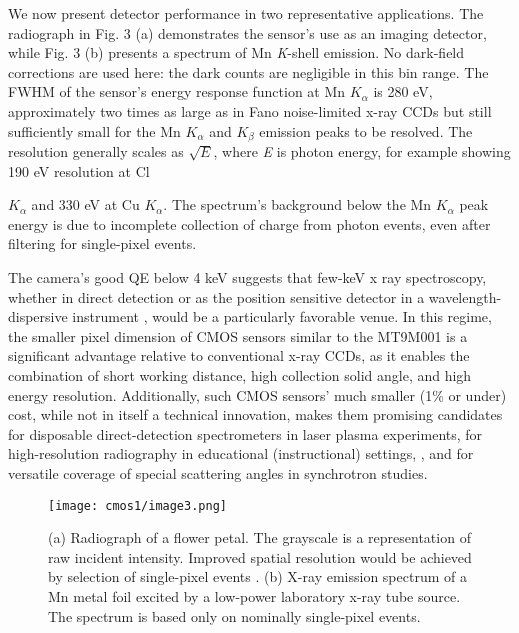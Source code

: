 We now present detector performance in two representative applications.
The radiograph in Fig. 3 (a) demonstrates the sensor's use as an imaging
detector, while Fig. 3 (b) presents a spectrum of Mn \emph{K}-shell
emission. No dark-field corrections are used here: the dark counts are
negligible in this bin range. The FWHM of the sensor's energy response
function at Mn \(K_{\alpha}\) is 280 eV, approximately two times as
large as in Fano noise-limited x-ray CCDs but still sufficiently small
for the Mn \(K_{\alpha}\) and \(K_{\beta}\) emission peaks to be
resolved. The resolution generally scales as \(\sqrt{E}\), where
\emph{E} is photon energy, for example showing 190 eV resolution at Cl
\(K_{\alpha}\)
and 330 eV at Cu \(K_{\alpha}\). The spectrum's background below the Mn
\(K_{\alpha}\) peak energy is due to incomplete collection of charge
from photon events, even after filtering for single-pixel events.

The camera's good QE below 4 keV suggests that few-keV x ray
spectroscopy, whether in direct detection or as the position sensitive
detector in a wavelength-dispersive
instrument \cite{HUOTARI2005IMPROVING}, would be a
particularly favorable venue. In this regime, the smaller pixel
dimension of CMOS sensors similar to the MT9M001 is a significant
advantage relative to conventional x-ray CCDs, as it enables the
combination of short working distance, high collection solid angle, and
high energy
resolution.
 \cite{PACOLD2012MINIATURE, MATTERN2012PLASTIC, DICKINSON2008SHORT} Additionally, such
CMOS sensors' much smaller (1\% or under) cost, while not in itself a
technical innovation, makes them promising candidates for disposable
direct-detection spectrometers in laser plasma experiments, for
high-resolution radiography in educational (instructional) settings, ,
and for versatile coverage of special scattering angles in synchrotron
studies.

\begin{figure}[h] \label{cm1image3}
\caption{ (a) Radiograph of a flower petal. The grayscale is a
representation of raw incident intensity. Improved spatial resolution
would be achieved by selection of single-pixel
events . (b) X-ray
emission spectrum of a Mn metal foil excited by a low-power laboratory
x-ray tube source. The spectrum is based only on nominally single-pixel
events.}
\centering
\texttt{[image: cmos1/image3.png]}
\end{figure}

